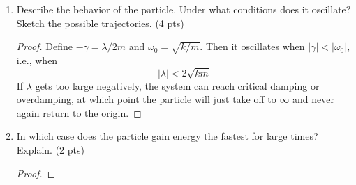 \documentclass[../psets.tex]{subfiles}
\begin{document}
\begin{enumerate}
\begin{enumerate}
\begin{proof}
            to get
            \begin{equation*}
                \boxed{x(t) = \frac{v}{\gamma_+-\gamma_-}(\e[\gamma_+t]-\e[\gamma_-t])}
            \end{equation*}
            Case 3 ($\gamma<\omega_0$): In this case, we'll have two complex roots. Define
            \begin{equation*}
                \omega = \sqrt{\omega_0-\gamma^2}
            \end{equation*}
            and write $p=\gamma\pm i\omega$. It follows that the general solution is
            \begin{align*}
                x(t) &= \frac{1}{2}A\e[\gamma t+i\omega t]+\frac{1}{2}B\e[\gamma t-i\omega t]\\
                &= a\e[\gamma t]\cos(\omega t-\theta)
            \end{align*}
            Adjusting for the initial conditions, we get
            \begin{equation*}
                \boxed{x(t) = \frac{v}{\omega}\e[\gamma t]\sin(\omega t)}
            \end{equation*}
            Case 3 ($\gamma=\omega_0$): In this case, we'll use an additional ansatz to get to the general solution
            \begin{equation*}
                x(t) = (a+bt)\e[\gamma t]
            \end{equation*}
            Solving in the initial conditions yields
            \begin{equation*}
                \boxed{x(t) = vt\e[\gamma t]}
            \end{equation*}
        \end{proof}
        \item Describe the behavior of the particle. Under what conditions does it oscillate? Sketch the possible trajectories. (4 pts)
        \begin{proof}
            Define $-\gamma=\lambda/2m$ and $\omega_0=\sqrt{k/m}$. Then it oscillates when $|\gamma|<|\omega_0|$, i.e., when
            \begin{equation*}
                \boxed{|\lambda| < 2\sqrt{km}}
            \end{equation*}
            If $\lambda$ gets too large negatively, the system can reach critical damping or overdamping, at which point the particle will just take off to $\infty$ and never again return to the origin.
        \end{proof}
        \item In which case does the particle gain energy the fastest for large times? Explain. (2 pts)
        \begin{proof}


\end{proof}
\end{enumerate}
\end{enumerate}
\end{document}
